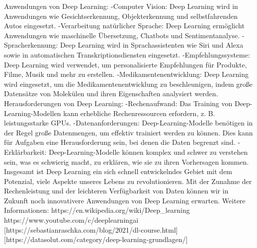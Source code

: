 \documentclass{article}
\begin{document}
{    
    Anwendungen von Deep Learning:
    -Computer Vision: Deep Learning wird in Anwendungen wie Gesichtserkennung, Objekterkennung und selbstfahrenden Autos eingesetzt.
    -Verarbeitung natürlicher Sprache: Deep Learning ermöglicht Anwendungen wie maschinelle Übersetzung, Chatbots und Sentimentanalyse.
    -Spracherkennung: Deep Learning wird in Sprachassistenten wie Siri und Alexa sowie in automatischen Transkriptionsdiensten eingesetzt.
    -Empfehlungssysteme: Deep Learning wird verwendet, um personalisierte Empfehlungen für Produkte, Filme, Musik und mehr zu erstellen.
    -Medikamentenentwicklung: Deep Learning wird eingesetzt, um die Medikamentenentwicklung zu beschleunigen, indem große Datensätze von Molekülen und ihren Eigenschaften analysiert werden.
    Herausforderungen von Deep Learning:
    -Rechenaufwand: Das Training von Deep-Learning-Modellen kann erhebliche Rechenressourcen erfordern, z. B. leistungsstarke GPUs.
    -Datenanforderungen: Deep-Learning-Modelle benötigen in der Regel große Datenmengen, um effektiv trainiert werden zu können. Dies kann für Aufgaben eine Herausforderung sein, bei denen die Daten begrenzt sind.
    -Erklärbarkeit: Deep-Learning-Modelle können komplex und schwer zu verstehen sein, was es schwierig macht, zu erklären, wie sie zu ihren Vorhersagen kommen.
    Insgesamt ist Deep Learning ein sich schnell entwickelndes Gebiet mit dem Potenzial, viele Aspekte unseres Lebens zu revolutionieren. Mit der Zunahme der Rechenleistung und der leichteren Verfügbarkeit von Daten können wir in Zukunft noch innovativere Anwendungen von Deep Learning erwarten.
    Weitere Informationen:
    https://en.wikipedia.org/wiki/Deep_learning
    https://www.youtube.com/c/deeplearningai
    [https://sebastianraschka.com/blog/2021/dl-course.html]
    [https://datasolut.com/category/deep-learning-grundlagen/]
    
    
    
    
    
}
\end{document}
